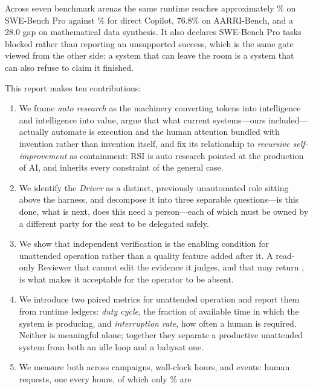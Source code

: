 Across seven benchmark arenas the same runtime reaches approximately
\SWEProArgusAccuracy\% on SWE-Bench Pro against \SWEProDirectAccuracy\% for direct
Copilot, 76.8\% on AARRI-Bench, and a 28.0 gap on mathematical data synthesis. It
also declares \ReviewerFirstBlocked{} SWE-Bench Pro tasks blocked rather than
reporting an unsupported success, which is the same gate viewed from the other side:
a system that can leave the room is a system that can also refuse to claim it
finished.

This report makes ten contributions:

\begin{enumerate}[label=\textbf{C\arabic*.}]
  \item We frame \emph{auto research} as the machinery converting tokens into
    intelligence and intelligence into value, argue that what current systems---ours
    included---actually automate is execution and the human attention bundled with
    invention rather than invention itself, and fix its relationship to
    \emph{recursive self-improvement} as containment: RSI is auto research pointed at
    the production of AI, and inherits every constraint of the general case.
  \item We identify the \emph{Driver} as a distinct, previously unautomated role
    sitting above the harness, and decompose it into three separable questions---is
    this done, what is next, does this need a person---each of which must be owned by
    a different party for the seat to be delegated safely.
  \item We show that independent verification is the enabling condition for
    unattended operation rather than a quality feature added after it. A read-only
    Reviewer that cannot edit the evidence it judges, and that may return
    , is what makes it acceptable for the operator to be absent.
  \item We introduce two paired metrics for unattended operation and report them
    from runtime ledgers: \emph{duty cycle}, the fraction of available time in which
    the system is producing, and \emph{interruption rate}, how often a human is
    required. Neither is meaningful alone; together they separate a productive
    unattended system from both an idle loop and a babysat one.
  \item We measure both across \DutyCampaigns{} campaigns, \DutyWallHours{}
    wall-clock hours, and \DutyEvents{} events: \DutyInterruptions{} human requests,
    one every \DutyInterval{} hours, of which only \DutyJudgmentPercent\% are

\end{enumerate}
